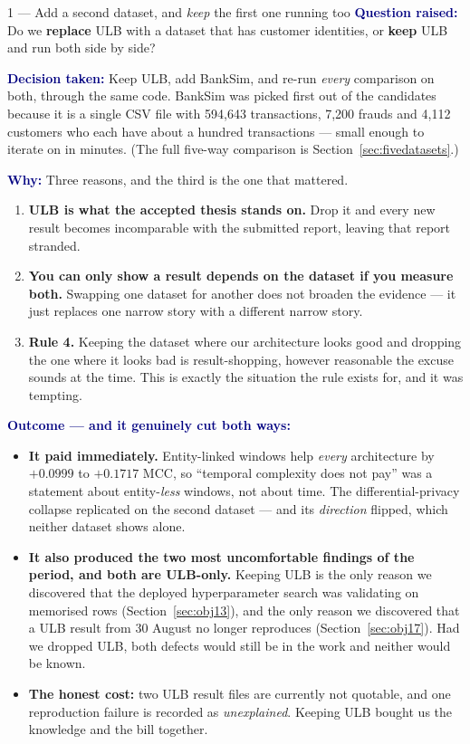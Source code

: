 \documentclass[11pt]{article}
\newcommand{\qlabel}[1]{\textbf{\textcolor{navy}{#1}}\;}
\begin{document}
\begin{decision}{1 --- Add a second dataset, and \emph{keep} the first one running too}
\qlabel{Question raised:} Do we \textbf{replace} ULB with a dataset that has customer identities, or
\textbf{keep} ULB and run both side by side?

\qlabel{Decision taken:} Keep ULB, add BankSim, and re-run \emph{every} comparison on both, through the
same code. BankSim was picked first out of the candidates because it is a single CSV file with 594{,}643
transactions, 7{,}200 frauds and 4{,}112 customers who each have about a hundred transactions --- small
enough to iterate on in minutes. (The full five-way comparison is Section~\ref{sec:fivedatasets}.)

\qlabel{Why:} Three reasons, and the third is the one that mattered.
\begin{enumerate}[topsep=2pt,label=(\roman*)]
\item \textbf{ULB is what the accepted thesis stands on.} Drop it and every new result becomes
incomparable with the submitted report, leaving that report stranded.
\item \textbf{You can only show a result depends on the dataset if you measure both.} Swapping one
dataset for another does not broaden the evidence --- it just replaces one narrow story with a different
narrow story.
\item \textbf{Rule 4.} Keeping the dataset where our architecture looks good and dropping the one where
it looks bad is result-shopping, however reasonable the excuse sounds at the time. This is exactly the
situation the rule exists for, and it was tempting.
\end{enumerate}

\qlabel{Outcome --- and it genuinely cut both ways:}
\begin{itemize}[topsep=2pt]
\item \textbf{It paid immediately.} Entity-linked windows help \emph{every} architecture by
$+0.0999$ to $+0.1717$ MCC, so ``temporal complexity does not pay'' was a statement about
entity-\emph{less} windows, not about time. The differential-privacy collapse replicated on the second
dataset --- and its \emph{direction} flipped, which neither dataset shows alone.
\item \textbf{It also produced the two most uncomfortable findings of the period, and both are
ULB-only.} Keeping ULB is the only reason we discovered that the deployed hyperparameter search was
validating on memorised rows (Section~\ref{sec:obj13}), and the only reason we discovered that a ULB
result from 30 August no longer reproduces (Section~\ref{sec:obj17}). Had we dropped ULB, both defects
would still be in the work and neither would be known.
\item \textbf{The honest cost:} two ULB result files are currently not quotable, and one reproduction
failure is recorded as \emph{unexplained}. Keeping ULB bought us the knowledge and the bill together.
\end{itemize}
\end{decision}
\end{document}

